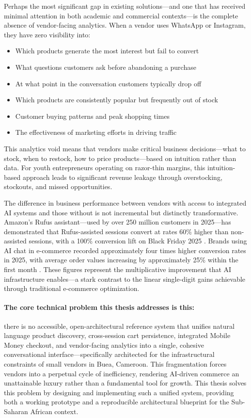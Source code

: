 \documentclass[12pt,a4paper]{article}
\begin{document}
Perhaps the most significant gap in existing solutions---and one that has received minimal attention in both academic and commercial contexts---is the complete absence of vendor-facing analytics. When a vendor uses WhatsApp or Instagram, they have zero visibility into:

\begin{itemize}
    \item Which products generate the most interest but fail to convert
    \item What questions customers ask before abandoning a purchase
    \item At what point in the conversation customers typically drop off
    \item Which products are consistently popular but frequently out of stock
    \item Customer buying patterns and peak shopping times
    \item The effectiveness of marketing efforts in driving traffic
\end{itemize}

This analytics void means that vendors make critical business decisions---what to stock, when to restock, how to price products---based on intuition rather than data. For youth entrepreneurs operating on razor-thin margins, this intuition-based approach leads to significant revenue leakage through overstocking, stockouts, and missed opportunities.

The difference in business performance between vendors with access to integrated AI systems and those without is not incremental but distinctly transformative. Amazon's Rufus assistant---used by over 250 million customers in 2025---has demonstrated that Rufus-assisted sessions convert at rates 60\% higher than non-assisted sessions, with a 100\% conversion lift on Black Friday 2025 \citep{amazon2025}. Brands using AI chat in e-commerce recorded approximately four times higher conversion rates in 2025, with average order values increasing by approximately 25\% within the first month \citep{gorgias2026}. These figures represent the multiplicative improvement that AI infrastructure enables---a stark contrast to the linear single-digit gains achievable through traditional e-commerce optimization.

\paragraph{The core technical problem this thesis addresses is this:} there is no accessible, open-architectural reference system that unifies natural language product discovery, cross-session cart persistence, integrated Mobile Money checkout, and vendor-facing analytics into a single, cohesive conversational interface---specifically architected for the infrastructural constraints of small vendors in Buea, Cameroon. This fragmentation forces vendors into a perpetual cycle of inefficiency, rendering AI-driven commerce an unattainable luxury rather than a fundamental tool for growth. This thesis solves this problem by designing and implementing such a unified system, providing both a working prototype and a reproducible architectural blueprint for the Sub-Saharan African context.
\end{document}
